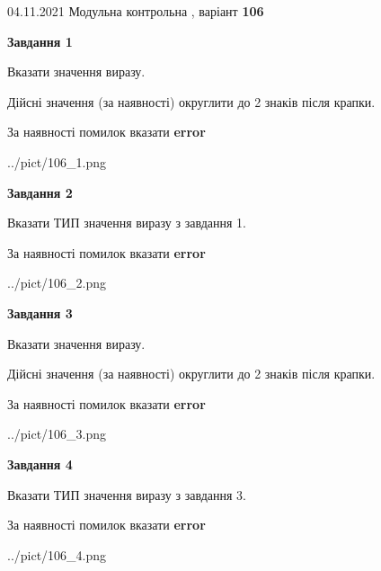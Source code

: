 \documentclass[11pt, ukrainian]{article}
\begin{document}
{04.11.2021 Модульна контрольна , варіант  \No \textbf { 106 }\par}
{
\begin {large}
{\begin {center}\textbf{Завдання 1}\end {center}}\par
Вказати значення виразу. \par
Дійсні значення (за наявності) округлити до 2 знаків після крапки. \par
За наявності помилок вказати \textbf{error}

\begin{center}
	{../pict/106_1.png}
\end{center}
\newpage

{\begin {center}\textbf{Завдання 2}\end {center}}\par
Вказати ТИП значення виразу з завдання 1. \par
За наявності помилок вказати \textbf{error}

\begin{center}
	{../pict/106_2.png}
\end{center}
\newpage

{\begin {center}\textbf{Завдання 3}\end {center}}\par
Вказати значення виразу. \par
Дійсні значення (за наявності) округлити до 2 знаків після крапки. \par
За наявності помилок вказати \textbf{error}

\begin{center}
	{../pict/106_3.png}
\end{center}
\newpage

{\begin {center}\textbf{Завдання 4}\end {center}}\par
Вказати ТИП значення виразу з завдання 3. \par
За наявності помилок вказати \textbf{error}

\begin{center}
	{../pict/106_4.png}
\end{center}
\newpage


\end{large}}
\end{document}
